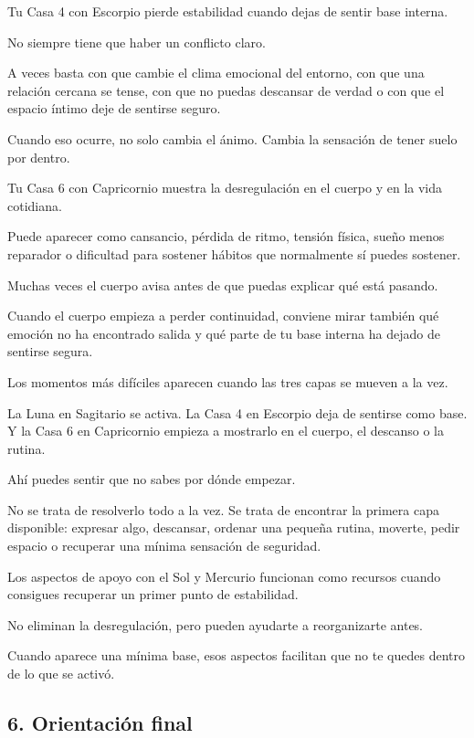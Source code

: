 \documentclass[11pt,a4paper]{article}
\begin{document}
Tu Casa 4 con Escorpio pierde estabilidad cuando dejas de sentir base interna.

No siempre tiene que haber un conflicto claro.

A veces basta con que cambie el clima emocional del entorno, con que una relación cercana se tense, con que no puedas descansar de verdad o con que el espacio íntimo deje de sentirse seguro.

Cuando eso ocurre, no solo cambia el ánimo. Cambia la sensación de tener suelo por dentro.

Tu Casa 6 con Capricornio muestra la desregulación en el cuerpo y en la vida cotidiana.

Puede aparecer como cansancio, pérdida de ritmo, tensión física, sueño menos reparador o dificultad para sostener hábitos que normalmente sí puedes sostener.

Muchas veces el cuerpo avisa antes de que puedas explicar qué está pasando.

Cuando el cuerpo empieza a perder continuidad, conviene mirar también qué emoción no ha encontrado salida y qué parte de tu base interna ha dejado de sentirse segura.

Los momentos más difíciles aparecen cuando las tres capas se mueven a la vez.

La Luna en Sagitario se activa.
La Casa 4 en Escorpio deja de sentirse como base.
Y la Casa 6 en Capricornio empieza a mostrarlo en el cuerpo, el descanso o la rutina.

Ahí puedes sentir que no sabes por dónde empezar.

No se trata de resolverlo todo a la vez.
Se trata de encontrar la primera capa disponible: expresar algo, descansar, ordenar una pequeña rutina, moverte, pedir espacio o recuperar una mínima sensación de seguridad.

Los aspectos de apoyo con el Sol y Mercurio funcionan como recursos cuando consigues recuperar un primer punto de estabilidad.

No eliminan la desregulación, pero pueden ayudarte a reorganizarte antes.

Cuando aparece una mínima base, esos aspectos facilitan que no te quedes dentro de lo que se activó.

\subsection{6. Orientación final}
\end{document}
